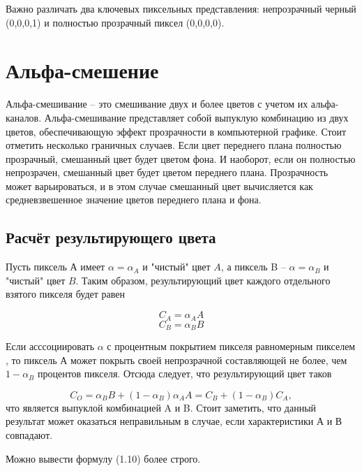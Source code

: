 Важно различать два ключевых пиксельных представления:
непрозрачный черный  (0,0,0,1) и полностью прозрачный пиксел  (0,0,0,0).


\section{Альфа-смешение}
Альфа-смешивание -- это смешивание двух и более цветов с учетом их альфа-каналов. Альфа-смешивание представляет собой выпуклую комбинацию из двух цветов, обеспечивающую эффект прозрачности в компьютерной графике. Стоит отметить несколько граничных случаев. Если цвет переднего плана полностью прозрачный, смешанный цвет будет цветом фона. И наоборот, если он полностью непрозрачен, смешанный цвет будет цветом переднего плана.
Прозрачность может варьироваться, и в этом случае смешанный цвет вычисляется как средневзвешенное значение цветов переднего плана и фона.

\subsection{Расчёт результирующего цвета}
Пусть пиксель А имеет $\alpha = \alpha_{A}$ и "чистый" цвет $A$, а пиксель B  -- $\alpha = \alpha_{B}$ и "чистый" цвет $B$. Таким образом,  результирующий цвет каждого отдельного взятого пикселя будет равен

\begin{equation}
C_{A} = \alpha_{A}A 
\end{equation}
\begin{equation}
C_{B} = \alpha_{B}B
\end{equation}

Если асссоциировать $\alpha$ с процентным покрытием пикселя равномерным пикселем \cite{bib1}, то пиксель А может покрыть своей непрозрачной составляющей не более, чем $1- \alpha_{B}$ процентов пикселя.  Отсюда следует, что результирующий цвет таков

\begin{equation}
C_{O} = \alpha_{B}B + (1- \alpha_{B})\alpha_{A}A = C_{B} + (1- \alpha_{B})C_{A},
\end{equation}
что является выпуклой комбинацией A и B.
Стоит заметить, что данный результат может оказаться неправильным в случае, если характеристики  А и В совпадают.  

Можно вывести формулу (1.10) более строго. 

